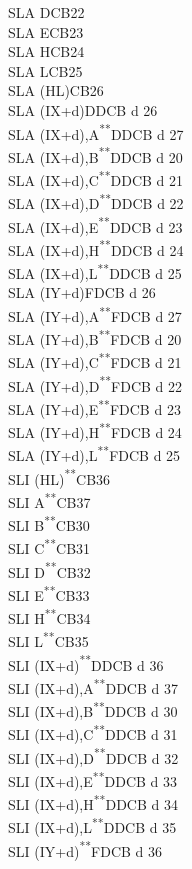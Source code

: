 \documentclass[12pt,twoside,openright,a4paper]{book}
\newcommand{\UNDOC}{\textnormal{\textsuperscript{**}}}
\begin{document}
\begin{multicols}{3}
{\begin{tabbing}
		SLA D\>CB22\\
		SLA E\>CB23\\
		SLA H\>CB24\\
		SLA L\>CB25\\
		SLA (HL)\>CB26\\
		SLA (IX+d)\>DDCB d 26\\
		SLA (IX+d),A\UNDOC\>DDCB d 27\\
		SLA (IX+d),B\UNDOC\>DDCB d 20\\
		SLA (IX+d),C\UNDOC\>DDCB d 21\\
		SLA (IX+d),D\UNDOC\>DDCB d 22\\
		SLA (IX+d),E\UNDOC\>DDCB d 23\\
		SLA (IX+d),H\UNDOC\>DDCB d 24\\
		SLA (IX+d),L\UNDOC\>DDCB d 25\\
		SLA (IY+d)\>FDCB d 26\\
		SLA (IY+d),A\UNDOC\>FDCB d 27\\
		SLA (IY+d),B\UNDOC\>FDCB d 20\\
		SLA (IY+d),C\UNDOC\>FDCB d 21\\
		SLA (IY+d),D\UNDOC\>FDCB d 22\\
		SLA (IY+d),E\UNDOC\>FDCB d 23\\
		SLA (IY+d),H\UNDOC\>FDCB d 24\\
		SLA (IY+d),L\UNDOC\>FDCB d 25\\
		SLI (HL)\UNDOC\>CB36\\
		SLI A\UNDOC\>CB37\\
		SLI B\UNDOC\>CB30\\
		SLI C\UNDOC\>CB31\\
		SLI D\UNDOC\>CB32\\
		SLI E\UNDOC\>CB33\\
		SLI H\UNDOC\>CB34\\
		SLI L\UNDOC\>CB35\\
		SLI (IX+d)\UNDOC\>DDCB d 36\\
		SLI (IX+d),A\UNDOC\>DDCB d 37\\
		SLI (IX+d),B\UNDOC\>DDCB d 30\\
		SLI (IX+d),C\UNDOC\>DDCB d 31\\
		SLI (IX+d),D\UNDOC\>DDCB d 32\\
		SLI (IX+d),E\UNDOC\>DDCB d 33\\
		SLI (IX+d),H\UNDOC\>DDCB d 34\\
		SLI (IX+d),L\UNDOC\>DDCB d 35\\
		SLI (IY+d)\UNDOC\>FDCB d 36\\

\end{tabbing}}
\end{multicols}
\end{document}
